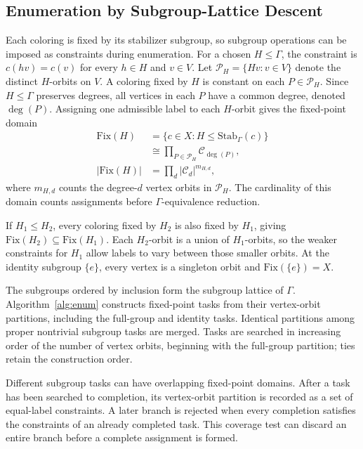 \documentclass[a5paper, 10pt]{article}
\begin{document}
\subsection{Enumeration by Subgroup-Lattice Descent}


\label{sec:enumeration}
Each coloring is fixed by its stabilizer subgroup, so subgroup operations can be imposed as constraints during enumeration. For a chosen $H\leq\Gamma$, the constraint is $c(hv)=c(v)$ for every $h\in H$ and $v\in V$. Let $\mathcal{P}_H=\{Hv:v\in V\}$ denote the distinct $H$-orbits on $V$. A coloring fixed by $H$ is constant on each $P\in\mathcal{P}_H$. Since $H\leq\Gamma$ preserves degrees, all vertices in each $P$ have a common degree, denoted $\deg(P)$. Assigning one admissible label to each $H$-orbit gives the fixed-point domain
\begin{equation}
\begin{aligned}
\mathrm{Fix}(H)&=\{c\in X:H\leq\mathrm{Stab}_{\Gamma}(c)\}\\
&\cong\prod_{P\in\mathcal{P}_H}\mathcal{C}_{\deg(P)},\\
|\mathrm{Fix}(H)|&=\prod_d|\mathcal{C}_d|^{m_{H,d}},
\end{aligned}
\label{eq:fixed_layer}
\end{equation}
where $m_{H,d}$ counts the degree-$d$ vertex orbits in $\mathcal{P}_H$. The cardinality of this domain counts assignments before $\Gamma$-equivalence reduction.

If $H_1\leq H_2$, every coloring fixed by $H_2$ is also fixed by $H_1$, giving $\mathrm{Fix}(H_2)\subseteq\mathrm{Fix}(H_1)$. Each $H_2$-orbit is a union of $H_1$-orbits, so the weaker constraints for $H_1$ allow labels to vary between those smaller orbits. At the identity subgroup $\{e\}$, every vertex is a singleton orbit and $\mathrm{Fix}(\{e\})=X$.

The subgroups ordered by inclusion form the subgroup lattice of $\Gamma$. Algorithm~\ref{alg:enum} constructs fixed-point tasks from their vertex-orbit partitions, including the full-group and identity tasks. Identical partitions among proper nontrivial subgroup tasks are merged. Tasks are searched in increasing order of the number of vertex orbits, beginning with the full-group partition; ties retain the construction order.

Different subgroup tasks can have overlapping fixed-point domains. After a task has been searched to completion, its vertex-orbit partition is recorded as a set of equal-label constraints. A later branch is rejected when every completion satisfies the constraints of an already completed task. This coverage test can discard an entire branch before a complete assignment is formed.
\end{document}
